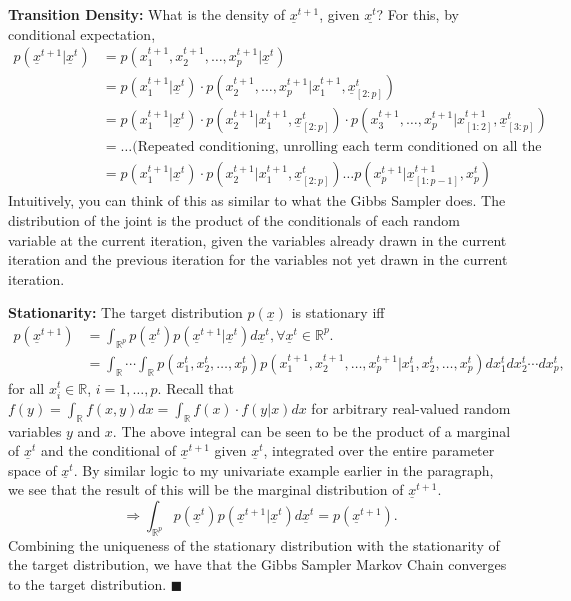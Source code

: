\documentclass[12pt]{article}
\begin{document}
\textbf{Transition Density:} What is the density of $\underline{x}^{t+1}$, given $\underline{x^t}$? For this, by conditional expectation,
\begin{align*}
p(\underline{x}^{t+1} | \underline{x}^{t}) &= p(x_1^{t+1}, x_2^{t+1}, \dots, x_p^{t+1} | \underline{x}^{t}) \\
&= p(x_1^{t+1} | \underline{x}^{t}) \cdot p(x_2^{t+1}, \dots, x_p^{t+1} | x_1^{t+1}, \underline{x}_{[2:p]}^{t}) \\
&= p(x_1^{t+1} | \underline{x}^{t}) \cdot p(x_2^{t+1} | x_1^{t+1}, \underline{x}_{[2:p]}^{t}) \cdot p(x_3^{t+1}, \dots, x_p^{t+1} | x_{[1:2]}^{t+1}, \underline{x}_{[3:p]}^{t}) \\
&= \dots \textrm{(Repeated conditioning, unrolling each term conditioned on all the rest,)} \\
&= p(x_1^{t+1} | \underline{x}^t) \cdot p(x_2^{t+1} | x_1^{t+1}, \underline{x}_{[2:p]}^{t}) \dots p(x_p^{t+1} | \underline{x}_{[1:p-1]}^{t+1}, x_p^t)
\end{align*}
Intuitively, you can think of this as similar to what the Gibbs Sampler does. The distribution of the joint is the product of the conditionals of each random variable at the current iteration, given the variables already drawn in the current iteration and the previous iteration for the variables not yet drawn in the current iteration.

\textbf{Stationarity:} The target distribution $p(\underline{x})$ is stationary iff
\begin{align*}
p(\underline{x}^{t+1}) &= \int_{\mathbb{R}^p} p(\underline{x}^{t}) p(\underline{x}^{t+1}| \underline{x}^{t}) d \underline{x}^t, \forall \underline{x}^t \in \mathbb{R}^p. \\
&= \int_{\mathbb{R}} \cdots \int_{\mathbb{R}} p(x_1^{t}, x_2^{t}, \dots, x_p^{t}) p(x_1^{t+1}, x_2^{t+1}, \dots, x_p^{t+1} | x_1^{t}, x_2^{t}, \dots, x_p^{t}) dx_1^t dx_2^t \cdots dx_p^t,
\end{align*}
for all $x_i^t \in \mathbb{R}$, $i=1, \dots, p$. Recall that $f(y) = \int_\mathbb{R} f(x,y) dx = \int_\mathbb{R} f(x) \cdot f(y|x) dx$ for arbitrary real-valued random variables $y$ and $x$. The above integral can be seen to be the product of a marginal of $\underline{x}^t$ and the conditional of $\underline{x}^{t+1}$ given $\underline{x}^t$, integrated over the entire parameter space of $\underline{x}^t$. By similar logic to my univariate example earlier in the paragraph, we see that the result of this will be the marginal distribution of $\underline{x}^{t+1}$.
\[ \Rightarrow \int_{\mathbb{R}^p} p(\underline{x}^{t}) p(\underline{x}^{t+1}| \underline{x}^{t}) d \underline{x}^t = p(\underline{x}^{t+1}). \]
Combining the uniqueness of the stationary distribution with the stationarity of the target distribution, we have that the Gibbs Sampler Markov Chain converges to the target distribution. $\blacksquare$
\end{document}
